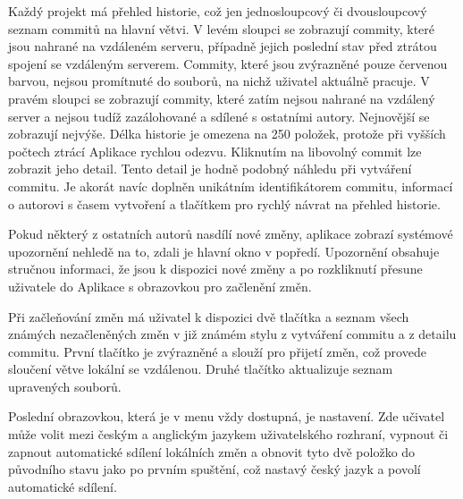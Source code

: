 Každý projekt má přehled historie, což jen jednosloupcový či dvousloupcový seznam commitů na hlavní větvi. V levém sloupci se zobrazují commity, které jsou nahrané na vzdáleném serveru, případně jejich poslední stav před ztrátou spojení se vzdáleným serverem. Commity, které jsou zvýrazněné pouze červenou barvou, nejsou promítnuté do souborů, na nichž uživatel aktuálně pracuje. V pravém sloupci se zobrazují commity, které zatím nejsou nahrané na vzdálený server a nejsou tudíž zazálohované a sdílené s ostatními autory. Nejnovější se zobrazují nejvýše. Délka historie je omezena na 250 položek, protože při vyšších počtech ztrácí Aplikace rychlou odezvu. Kliknutím na libovolný commit lze zobrazit jeho detail. Tento detail je hodně podobný náhledu při vytváření commitu. Je akorát navíc doplněn unikátním identifikátorem commitu, informací o autorovi s časem vytvoření a tlačítkem pro rychlý návrat na přehled historie.

Pokud některý z ostatních autorů nasdílí nové změny, aplikace zobrazí systémové upozornění nehledě na to, zdali je hlavní okno v popředí. Upozornění obsahuje stručnou informaci, že jsou k dispozici nové změny a po rozkliknutí přesune uživatele do Aplikace s obrazovkou pro začlenění změn.

Při začleňování změn má uživatel k dispozici dvě tlačítka a seznam všech známých nezačleněných změn v již známém stylu z vytváření commitu a z detailu commitu. První tlačítko je zvýrazněné a slouží pro přijetí změn, což provede sloučení větve lokální se vzdálenou. Druhé tlačítko aktualizuje seznam upravených souborů.

Poslední obrazovkou, která je v menu vždy dostupná, je nastavení. Zde učivatel může volit mezi českým a anglickým jazykem uživatelského rozhraní, vypnout či zapnout automatické sdílení lokálních změn a obnovit tyto dvě položko do původního stavu jako po prvním spuštění, což nastavý český jazyk a povolí automatické sdílení.
